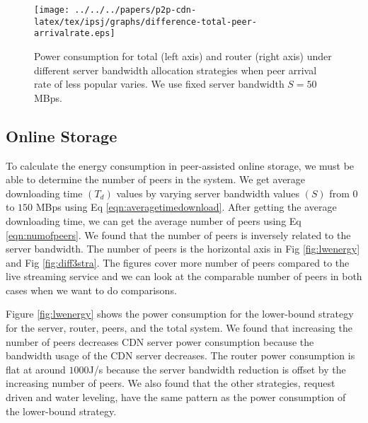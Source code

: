 \begin{figure}[h]
\begin{center}
\texttt{[image: ../../../papers/p2p-cdn-latex/tex/ipsj/graphs/difference-total-peer-arrivalrate.eps]}
\end{center}
\caption{Power consumption for total (left axis) and router (right axis) under different server bandwidth allocation strategies when peer arrival rate of less popular varies. We use fixed server bandwidth $S=50$ MBps.}
\label{fig:diffarrivalrate}
\vspace{-2mm}
\end{figure} 


\subsection{Online Storage}

To calculate the energy consumption in peer-assisted online storage, we must be able to determine the number of peers in the system. 
We get average downloading time $(T_d)$  values by varying server bandwidth values $(S)$ from $0$ to $150$ MBps using Eq \ref{eqn:averagetimedownload}. 
After getting the average downloading time, we can get the average number of peers using Eq \ref{eqn:numofpeers}. 
We found that the number of peers is inversely related to the server bandwidth.  
The number of peers is the horizontal axis in Fig \ref{fig:lwenergy} and Fig \ref{fig:diff3stra}. 
The figures cover more number of peers compared to the live streaming service and we can look at the comparable number of peers in both cases when we want to do comparisons.

Figure \ref{fig:lwenergy} shows the power consumption for the lower-bound strategy for the server, router, peers, and the total system. 
We found that increasing the number of peers decreases CDN server power consumption because the bandwidth usage of the CDN server decreases. 
The router power consumption is flat at around $1000$J/s because the server bandwidth reduction is offset by the increasing number of peers. 
We also found that the other strategies, request driven and water leveling, have the same pattern as the power consumption of the lower-bound strategy.

